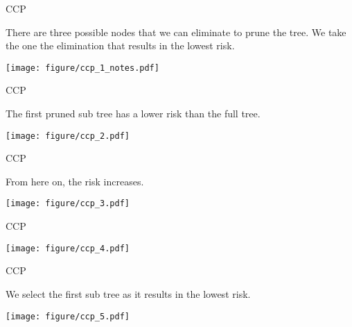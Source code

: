 \documentclass[11pt,compress,t,notes=noshow, xcolor=table]{beamer}
\begin{document}
\begin{frame}[noframenumbering]{CCP}

There are three possible nodes that we can eliminate to prune the tree.
We take the one the elimination that results in the lowest risk.

\vspace{0.25cm}

\color{fgcolor}

{\centering \texttt{[image: figure/ccp\_1\_notes.pdf]} 

}

\end{frame}

\begin{frame}[noframenumbering]{CCP}

The first pruned sub tree has a lower risk than the full tree.
\vspace{0.25cm}

{\centering \texttt{[image: figure/ccp\_2.pdf]} 

}

\end{frame}

\begin{frame}[noframenumbering]{CCP}

From here on, the risk increases.
\vspace{0.25cm}


{\centering \texttt{[image: figure/ccp\_3.pdf]} 

}

\end{frame}

\begin{frame}[noframenumbering]{CCP}


{\centering \texttt{[image: figure/ccp\_4.pdf]} 

}


\end{frame}

\begin{frame}[noframenumbering]{CCP}

We select the first sub tree as it results in the lowest risk.
\vspace{0.25cm}


{\centering \texttt{[image: figure/ccp\_5.pdf]} 

}


\end{frame}



\endlecture
\end{document}
